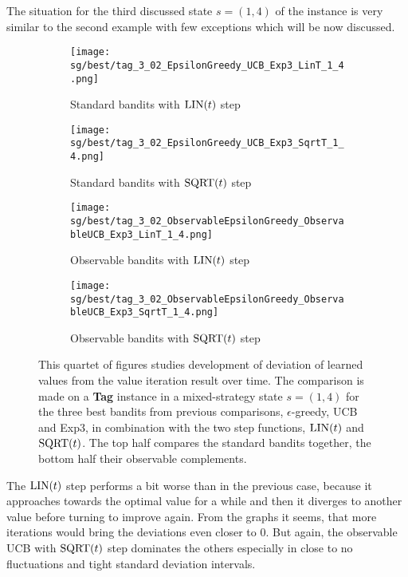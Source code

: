 \documentclass[../main.tex]{subfiles}
\begin{document}
The situation  for the third discussed state $s = \left(1, 4\right)$ of the instance   is very similar to the second example with few exceptions which will be now discussed.
\begin{figure}[ht]
    \begin{subfigure}[t]{0.45\linewidth}
        \texttt{[image: sg/best/tag\_3\_02\_EpsilonGreedy\_UCB\_Exp3\_LinT\_1\_4.png]}
        \caption{Standard bandits with $\text{LIN}(t)$ step}
        \label{exp:sg:best:302:14:std:lin}
    \end{subfigure}
    \hfill
    \begin{subfigure}[t]{0.45\linewidth}
        \texttt{[image: sg/best/tag\_3\_02\_EpsilonGreedy\_UCB\_Exp3\_SqrtT\_1\_4.png]}
        \caption{Standard bandits with $\text{SQRT}(t)$ step}
        \label{exp:sg:best:302:14:std:sqrt}
    \end{subfigure}
    \begin{subfigure}[t]{0.45\linewidth}
        \texttt{[image: sg/best/tag\_3\_02\_ObservableEpsilonGreedy\_ObservableUCB\_Exp3\_LinT\_1\_4.png]}
        \caption{Observable bandits with $\text{LIN}(t)$ step}
        \label{exp:sg:best:302:14:obs:lint}
    \end{subfigure}
    \hfill
    \begin{subfigure}[t]{0.45\linewidth}
        \texttt{[image: sg/best/tag\_3\_02\_ObservableEpsilonGreedy\_ObservableUCB\_Exp3\_SqrtT\_1\_4.png]}
        \caption{Observable bandits with $\text{SQRT}(t)$ step}
        \label{exp:sg:best:302:14:obs:sqrt}
    \end{subfigure}
    \caption[Comparison of three best bandits and their observable counterparts on  in a state $s = \left(1, 4\right)$]{
        This quartet of figures studies development of deviation of learned values from the value iteration result over time.
        The comparison is made on a \textbf{Tag} instance  in a mixed-strategy state $s = \left(1, 4\right)$ for the three best bandits from previous comparisons, $\epsilon$-greedy, UCB and Exp3, in combination with the two step functions, $\text{LIN}(t)$ and $\text{SQRT}(t)$.
        The top half compares the standard bandits together, the bottom half their observable complements.
    }
    \label{exp:sg:best:302:14}
\end{figure}
The $\text{LIN}(t)$ step performs a bit worse than in the previous case, because it approaches towards the optimal value for a while and then it diverges to another value before turning to improve again.
From the graphs it seems, that more iterations would bring the deviations even closer to $0$.
But again, the observable UCB with $\text{SQRT}(t)$ step dominates the others especially in close to no fluctuations and tight standard deviation intervals.
\end{document}
